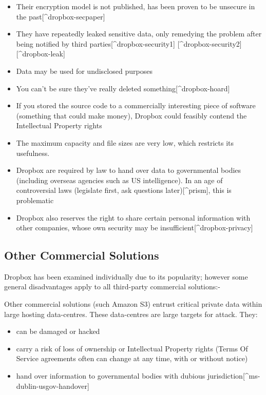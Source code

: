 \documentclass[12pt,a4paper,]{adreport}
\begin{document}
\begin{itemize}
\itemsep1pt\parskip0pt
\item
  Their encryption model is not published, has been proven to be
  unsecure in the past{[}\^{}dropbox-secpaper{]}
\item
  They have repeatedly leaked sensitive data, only remedying the problem
  after being notified by third parties{[}\^{}dropbox-security1{]}
  {[}\^{}dropbox-security2{]} {[}\^{}dropbox-leak{]}
\item
  Data may be used for undisclosed purposes
\item
  You can't be sure they've really deleted
  something{[}\^{}dropbox-hoard{]}
\item
  If you stored the source code to a commercially interesting piece of
  software (something that could make money), Dropbox could feasibly
  contend the Intellectual Property rights
\item
  The maximum capacity and file sizes are very low, which restricts its
  usefulness.
\item
  Dropbox are required by law to hand over data to governmental bodies
  (including overseas agencies such as US intelligence). In an age of
  controversial laws (legislate first, ask questions
  later){[}\^{}prism{]}, this is problematic
\item
  Dropbox also reserves the right to share certain personal information
  with other companies, whose own security may be
  insufficient{[}\^{}dropbox-privacy{]}
\end{itemize}

\subsection{Other Commercial
Solutions}\label{other-commercial-solutions}

Dropbox has been examined individually due to its popularity; however
some general disadvantages apply to all third-party commercial
solutions:-

Other commercial solutions (such Amazon S3) entrust critical private
data within large hosting data-centres. These data-centres are large
targets for attack. They:

\begin{itemize}
\itemsep1pt\parskip0pt
\item
  can be damaged or hacked
\item
  carry a risk of loss of ownership or Intellectual Property rights
  (Terms Of Service agreements often can change at any time, with or
  without notice)
\item
  hand over information to governmental bodies with dubious
  jurisdiction{[}\^{}ms-dublin-usgov-handover{]}
\end{itemize}
\end{document}
